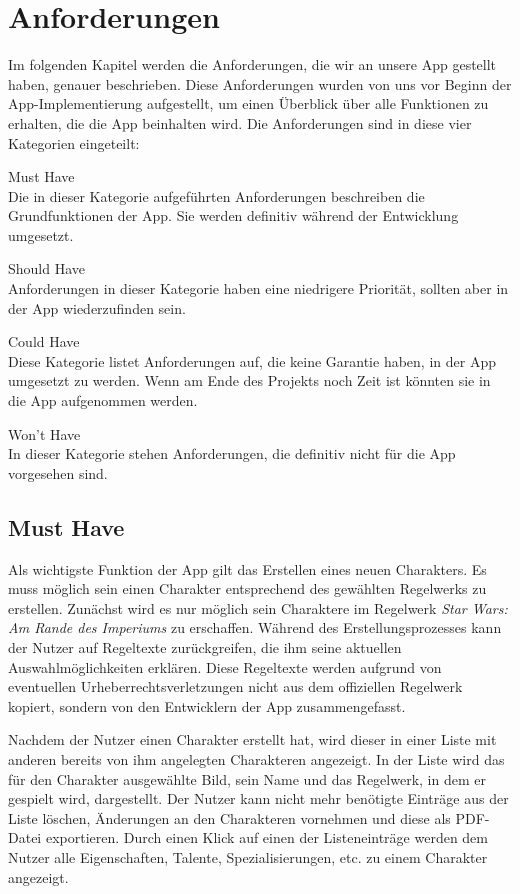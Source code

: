 \newpage
\section{Anforderungen}
Im folgenden Kapitel werden die Anforderungen, die wir an unsere App gestellt haben, genauer beschrieben. Diese Anforderungen wurden von uns vor Beginn der App-Implementierung aufgestellt, um einen Überblick über alle Funktionen zu erhalten, die die App beinhalten wird. Die Anforderungen sind in diese vier Kategorien eingeteilt:
\begin{description}
\item Must Have \\
Die in dieser Kategorie aufgeführten Anforderungen beschreiben die Grundfunktionen der App. Sie werden definitiv während der Entwicklung umgesetzt.
\item Should Have \\
Anforderungen in dieser Kategorie haben eine niedrigere Priorität, sollten aber in der App wiederzufinden sein.
\item Could Have \\
Diese Kategorie listet Anforderungen auf, die keine Garantie haben, in der App umgesetzt zu werden. Wenn am Ende des Projekts noch Zeit ist könnten sie in die App aufgenommen werden.
\item Won't Have \\
In dieser Kategorie stehen Anforderungen, die definitiv nicht für die App vorgesehen sind.
\end{description}

\subsection{Must Have}
Als wichtigste Funktion der App gilt das Erstellen eines neuen Charakters. Es muss möglich sein einen Charakter entsprechend des gewählten Regelwerks zu erstellen. Zunächst wird es nur möglich sein Charaktere im Regelwerk \textit{Star Wars: Am Rande des Imperiums} zu erschaffen. Während des Erstellungsprozesses kann der Nutzer auf Regeltexte zurückgreifen, die ihm seine aktuellen Auswahlmöglichkeiten erklären. Diese Regeltexte werden aufgrund von eventuellen Urheberrechtsverletzungen nicht aus dem offiziellen Regelwerk kopiert, sondern von den Entwicklern der App zusammengefasst.

Nachdem der Nutzer einen Charakter erstellt hat, wird dieser in einer Liste mit anderen bereits von ihm angelegten Charakteren angezeigt. In der Liste wird das für den Charakter ausgewählte Bild, sein Name und das Regelwerk, in dem er gespielt wird, dargestellt. Der Nutzer kann nicht mehr benötigte Einträge aus der Liste löschen, Änderungen an den Charakteren vornehmen und diese als PDF-Datei exportieren. Durch einen Klick auf einen der Listeneinträge werden dem Nutzer alle Eigenschaften, Talente, Spezialisierungen, etc. zu einem Charakter angezeigt.

